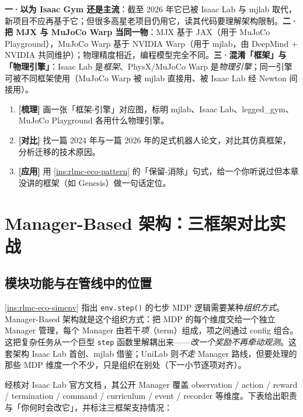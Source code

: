 \begin{pitfall}[三个关于生态的常见误解]
\textbf{一·以为 Isaac Gym 还是主流}：截至 2026 年它已被 Isaac Lab 与 mjlab 取代，新项目不应再基于它；但很多高星老项目仍用它，读其代码要理解架构限制。\textbf{二·把 MJX 与 MuJoCo Warp 当同一物}：MJX 基于 JAX（用于 MuJoCo Playground），MuJoCo Warp 基于 NVIDIA Warp（用于 mjlab，由 DeepMind + NVIDIA 共同维护）；物理精度相近，编程模型完全不同。\textbf{三·混淆「框架」与「物理引擎」}：Isaac Lab 是\emph{框架}、PhysX/MuJoCo Warp 是\emph{物理引擎}；同一引擎可被不同框架使用（MuJoCo Warp 被 mjlab 直接用、被 Isaac Lab 经 Newton 间接用）。
\end{pitfall}

\begin{practice}[练习·生态演进]
\begin{enumerate}
  \item \textbf{[梳理]} 画一张「框架-引擎」对应图，标明 mjlab、Isaac Lab、legged\_gym、MuJoCo Playground 各用什么物理引擎。
  \item \textbf{[对比]} 找一篇 2024 年与一篇 2026 年的足式机器人论文，对比其仿真框架，分析迁移的技术原因。
  \item \textbf{[应用]} 用 \cref{ins:rlmc-eco-pattern} 的「保留-消除」句式，给一个你听说过但本章没讲的框架（如 Genesis）做一句话定位。
\end{enumerate}
\end{practice}

\section{Manager-Based 架构：三框架对比实战}
\label{sec:rlmc-eco-manager}

\subsection{模块功能与在管线中的位置}

\cref{ins:rlmc-eco-simenv} 指出 \verb|env.step()| 的七步 MDP 逻辑需要某种\emph{组织方式}。Manager-Based 架构就是这个组织方式：把 MDP 的每个维度交给一个独立 Manager 管理，每个 Manager 由若干\emph{项}（term）组成，项之间通过 config 组合。这把复杂任务从一个巨型 \verb|step| 函数里解耦出来——\emph{改一个奖励不再牵动观测}。这套架构 Isaac Lab 首创、mjlab 借鉴；UniLab 则\emph{不走} Manager 路线，但要处理的那些 MDP 维度一个不少，只是组织在别处（下一小节逐项对齐）。

经核对 Isaac Lab 官方文档\,\cite{mittal2025isaaclab}，其公开 Manager 覆盖 observation / action / reward / termination / command / curriculum / event / recorder 等维度。下表给出职责与「你何时会改它」，并标注三框架支持情况：

